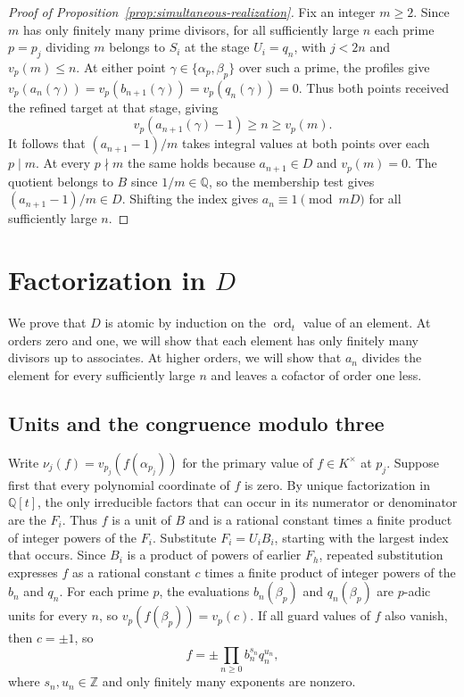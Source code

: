 \documentclass{article}
\DeclareMathOperator{\ord}{ord}
\theoremstyle{remark}
\begin{document}
\begin{proof}[Proof of Proposition~\ref{prop:simultaneous-realization}]
    Fix an integer $m \ge 2$.
    Since $m$ has only finitely many prime divisors, for all sufficiently large $n$ each prime $p = p_j$ dividing $m$ belongs to $S_i$ at the stage $U_i = q_n$, with $j < 2n$ and $v_p(m) \le n$.
    At either point $\gamma \in \{\alpha_p, \beta_p\}$ over such a prime, the profiles give $v_p(a_n(\gamma)) = v_p(b_{n + 1}(\gamma)) = v_p(q_n(\gamma)) = 0$.
    Thus both points received the refined target at that stage, giving
    \[
        v_p(a_{n + 1}(\gamma) - 1) \ge n \ge v_p(m).
    \]
    It follows that $(a_{n + 1} - 1)/m$ takes integral values at both points over each $p \mid m$.
    At every $p \nmid m$ the same holds because $a_{n + 1} \in D$ and $v_p(m) = 0$.
    The quotient belongs to $B$ since $1/m \in \mathbb{Q}$, so the membership test gives $(a_{n + 1} - 1)/m \in D$.
    Shifting the index gives $a_n \equiv 1 \pmod{mD}$ for all sufficiently large $n$.
\end{proof}

\section{Factorization in \texorpdfstring{$D$}{D}}

We prove that $D$ is atomic by induction on the $\ord_t$ value of an element.
At orders zero and one, we will show that each element has only finitely many divisors up to associates.
At higher orders, we will show that $a_n$ divides the element for every sufficiently large $n$ and leaves a cofactor of order one less.

\subsection{Units and the congruence modulo three}

Write $\nu_j(f) = v_{p_j}(f(\alpha_{p_j}))$ for the primary value of $f \in K^\times$ at $p_j$.
Suppose first that every polynomial coordinate of $f$ is zero.
By unique factorization in $\mathbb{Q}[t]$, the only irreducible factors that can occur in its numerator or denominator are the $F_i$.
Thus $f$ is a unit of $B$ and is a rational constant times a finite product of integer powers of the $F_i$.
Substitute $F_i = U_i B_i$, starting with the largest index that occurs.
Since $B_i$ is a product of powers of earlier $F_h$, repeated substitution expresses $f$ as a rational constant $c$ times a finite product of integer powers of the $b_n$ and $q_n$.
For each prime $p$, the evaluations $b_n(\beta_p)$ and $q_n(\beta_p)$ are $p$-adic units for every $n$, so $v_p(f(\beta_p)) = v_p(c)$.
If all guard values of $f$ also vanish, then $c = \pm 1$, so
\begin{equation}
    \label{eq:primary-supported-product}
    f = \pm \prod_{n \ge 0} b_n^{s_n} q_n^{u_n},
\end{equation}
where $s_n, u_n \in \mathbb{Z}$ and only finitely many exponents are nonzero.
\end{document}

